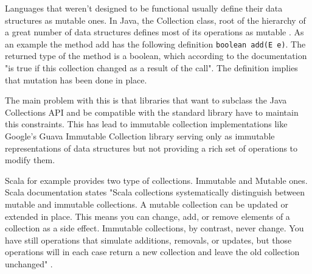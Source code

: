 \documentclass[../main.tex]{subfiles}
\begin{document}
Languages that weren't designed to be functional usually define their data
structures as mutable ones. In Java, the Collection class, root of the hierarchy
of a great number of data structures defines most of its operations as mutable
\autocite{Collection}. As an example the method add has the following definition
\texttt{boolean add(E e)}. The returned type of the method is a boolean, which
according to the documentation "is true if this collection changed as a result
of the call". The definition implies that mutation has been done in place.

The main problem with this is that libraries that want to subclass the Java
Collections API and be compatible with the standard library have to maintain
this constraints. This has lead to immutable collection implementations like
Google's Guava Immutable Collection library \autocite{ImmutableCollectionAPI}
serving only as immutable representations of data structures but not providing a
rich set of operations to modify them.

Scala for example provides two type of collections. Immutable and Mutable ones.
Scala documentation states "Scala collections systematically distinguish between
mutable and immutable collections. A mutable collection can be updated or
extended in place. This means you can change, add, or remove elements of a
collection as a side effect. Immutable collections, by contrast, never change.
You have still operations that simulate additions, removals, or updates, but
those operations will in each case return a new collection and leave the old
collection unchanged" \autocite{MutableDocumentation}.
\end{document}
